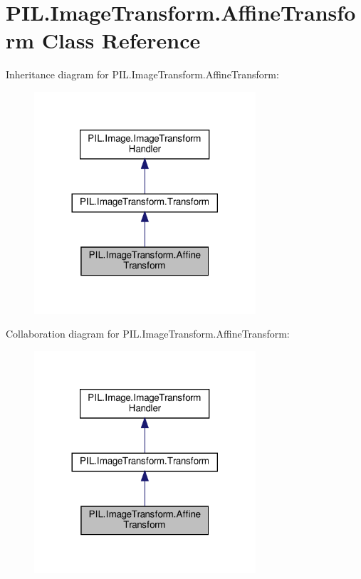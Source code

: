 \hypertarget{classPIL_1_1ImageTransform_1_1AffineTransform}{}\section{P\+I\+L.\+Image\+Transform.\+Affine\+Transform Class Reference}
\label{classPIL_1_1ImageTransform_1_1AffineTransform}


Inheritance diagram for P\+I\+L.\+Image\+Transform.\+Affine\+Transform\+:
\nopagebreak
\begin{figure}[H]
\begin{center}
\leavevmode
\includegraphics[width=233pt]{classPIL_1_1ImageTransform_1_1AffineTransform__inherit__graph}
\end{center}
\end{figure}


Collaboration diagram for P\+I\+L.\+Image\+Transform.\+Affine\+Transform\+:
\nopagebreak
\begin{figure}[H]
\begin{center}
\leavevmode
\includegraphics[width=233pt]{classPIL_1_1ImageTransform_1_1AffineTransform__coll__graph}
\end{center}
\end{figure}
